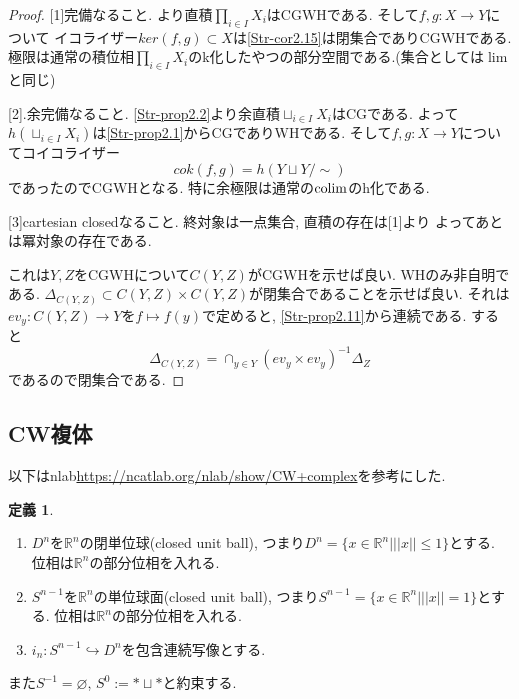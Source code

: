 \documentclass[dvipdfmx,a4paper,11pt]{article}
\newcommand{\R}{\mathbb{R}}
\newcommand{\colim}{{\rm colim}}
\theoremstyle{definition}
\newtheorem{dfn}[thm]{定義}
\begin{document}
\begin{proof}

[1]完備なること. 
\label{Str^cor2.16}より直積$\prod_{i \in I}X_i$はCGWHである. 
そして$f,g : X \to Y$について
イコライザー$ker(f,g) \subset X$は\ref{Str-cor2.15}は閉集合でありCGWHである.
極限は通常の積位相$\prod_{i \in I}X_i$のk化したやつの部分空間である.(集合としては$\lim$と同じ)

[2].余完備なること.
\ref{Str-prop2.2}より余直積$\sqcup_{i \in I}X_i$はCGである.
よって$h(\sqcup_{i \in I}X_i)$は\ref{Str-prop2.1}からCGでありWHである.
そして$f,g : X \to Y$についてコイコライザー
$$
cok(f,g)=h(Y \sqcup Y/\sim)
$$
であったのでCGWHとなる.
特に余極限は通常の$\colim$のh化である. 

[3]cartesian closedなること.
終対象は一点集合, 直積の存在は[1]より
よってあとは冪対象の存在である.

これは$Y,Z$をCGWHについて$C(Y,Z)$がCGWHを示せば良い.
WHのみ非自明である. 
$\Delta_{C(Y,Z)} \subset C(Y,Z)\times C(Y,Z)$が閉集合であることを示せば良い.
それは$ev_y : C(Y,Z) \to Y$を$f\mapsto f(y)$で定めると, \ref{Str-prop2.11}から連続である. 
すると
$$
\Delta_{C(Y,Z)} = \cap_{y \in Y}(ev_y \times ev_y)^{-1}\Delta_{Z}
$$
であるので閉集合である. 
\end{proof}

\subsection{CW複体}
以下はnlab\url{https://ncatlab.org/nlab/show/CW+complex}を参考にした. 
 \begin{tcolorbox}
 [colback = white, colframe = green!35!black, fonttitle = \bfseries,breakable = true]
\begin{dfn}
\begin{enumerate}
\item $D^n$を$\R^n$の閉単位球(closed unit ball), つまり$D^n = \{x \in \R^n | ||x|| \le 1 \}$とする. 位相は$\R^n$の部分位相を入れる. 
\item $S^{n-1}$を$\R^n$の単位球面(closed unit ball), つまり$S^{n-1} = \{x \in \R^n | ||x|| =1 \}$とする. 位相は$\R^n$の部分位相を入れる. 
\item $i_n : S^{n-1} \hookrightarrow D^n$を包含連続写像とする. 
\end{enumerate}
また$S^{-1} = \varnothing$, $S^0 := \ast \sqcup \ast$と約束する.
\end{dfn}
\end{tcolorbox}
\end{document}

